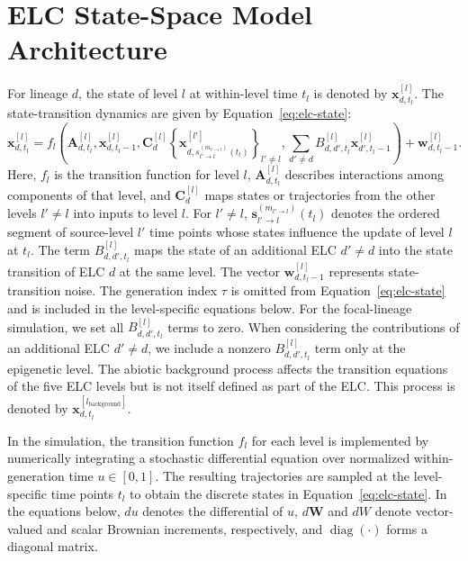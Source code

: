 \documentclass[11pt]{article}
\begin{document}
\section{ELC State-Space Model Architecture}
For lineage $d$, the state of level $l$ at within-level time $t_l$ is denoted by $\mathbf{x}_{d,t_l}^{[l]}$. The state-transition dynamics are given by Equation~\ref{eq:elc-state}:
\begin{equation}
\mathbf{x}_{d,t_l}^{[l]}
=
f_l\!\left(
\mathbf{A}_{d,t_l}^{[l]},
\mathbf{x}_{d,t_l-1}^{[l]},
\mathbf{C}_{d}^{[l]}
\left\{
\mathbf{x}_{d,s_{l'\to l}^{(m_{l'\to l})}(t_l)}^{[l']}
\right\}_{l' \neq l},
\sum_{d' \neq d}
B_{d,d',t_l}^{[l]}
\mathbf{x}_{d',t_l-1}^{[l]}
\right)
+
\mathbf{w}_{d,t_l-1}^{[l]} .
\label{eq:elc-state}
\end{equation}
Here, $f_l$ is the transition function for level $l$, $\mathbf{A}_{d,t_l}^{[l]}$ describes interactions among components of that level, and $\mathbf{C}_{d}^{[l]}$ maps states or trajectories from the other levels $l'\neq l$ into inputs to level $l$. For $l' \neq l$, $\mathbf{s}_{l'\to l}^{(m_{l'\to l})}(t_l)$ denotes the ordered segment of source-level $l'$ time points whose states influence the update of level $l$ at $t_l$. The term $B_{d,d',t_l}^{[l]}$ maps the state of an additional ELC $d'\neq d$ into the state transition of ELC $d$ at the same level. The vector $\mathbf{w}_{d,t_l-1}^{[l]}$ represents state-transition noise. The generation index $\tau$ is omitted from Equation~\ref{eq:elc-state} and is included in the level-specific equations below. For the focal-lineage simulation, we set all $B^{[l]}_{d,d',t_l}$ terms to zero. When considering the contributions of an additional ELC $d' \neq d$, we include a nonzero $B^{[l]}_{d,d',t_l}$ term only at the epigenetic level. The abiotic background process affects the transition equations of the five ELC levels but is not itself defined as part of the ELC. This process is denoted by $\mathbf{x}_{d,t_l}^{[l_{\mathrm{background}}]}$.

In the simulation, the transition function $f_l$ for each level is implemented by numerically integrating a stochastic differential equation over normalized within-generation time $u\in[0,1]$. The resulting trajectories are sampled at the level-specific time points $t_l$ to obtain the discrete states in Equation~\ref{eq:elc-state}. In the equations below, $du$ denotes the differential of $u$, $d\mathbf{W}$ and $dW$ denote vector-valued and scalar Brownian increments, respectively, and $\operatorname{diag}(\cdot)$ forms a diagonal matrix.
\end{document}
